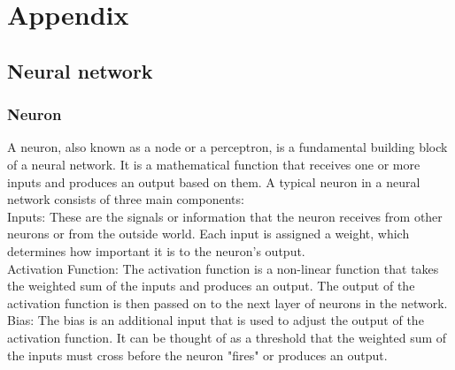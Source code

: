\documentclass[a4paper, noexaminfo]{sapthesis}
\begin{document}
\chapter{Appendix}
\section {Neural network}
\subsection{Neuron}\label{sec:neuron}
A neuron, also known as a node or a perceptron, is a fundamental building
 block of a neural network. It is a mathematical function that receives one
or more inputs and produces an output based on them. \newline 
A typical neuron in a neural network consists of three main components:\newline \\
Inputs: These are the signals or information that the neuron receives from 
other neurons or from the outside world.
 Each input is assigned a weight, which determines how important it is 
 to the neuron's output. \newline \\
Activation Function: The activation function is a non-linear function 
that takes the weighted sum of the inputs and produces an output. 
The output of the activation function is then passed on to the next 
layer of neurons in the network.\newline \\
Bias: The bias is an additional input that is used to adjust the output 
of the activation function. It can be thought of as a threshold that the 
weighted sum of the inputs must cross before the neuron "fires" or 
produces an output.
\end{document}
